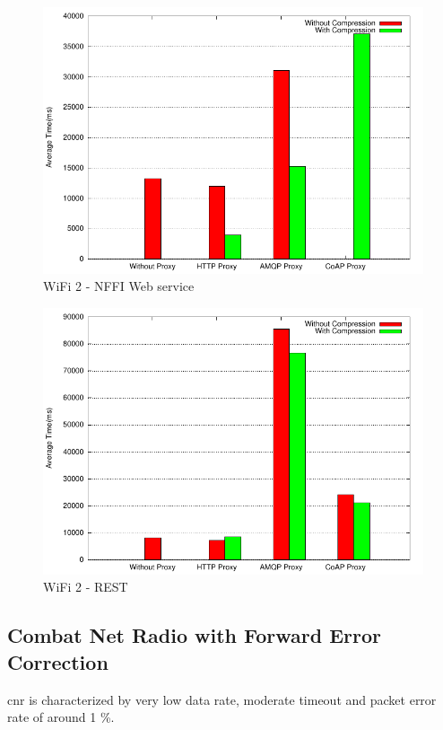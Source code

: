 \begin{figure}[H]
\center
\includegraphics[scale=0.75]{../results/wifi2/nffi/result.pdf}
\caption{WiFi 2 - NFFI Web service}
\end{figure}

\begin{figure}[H]
\center
\includegraphics[scale=0.75]{../results/wifi2/rest/result.pdf}
\caption{WiFi 2 - REST}
\end{figure}

\subsection{Combat Net Radio with Forward Error Correction}

\gls{cnr} is characterized by very low data rate, moderate timeout and packet
error rate of around 1 \%.


